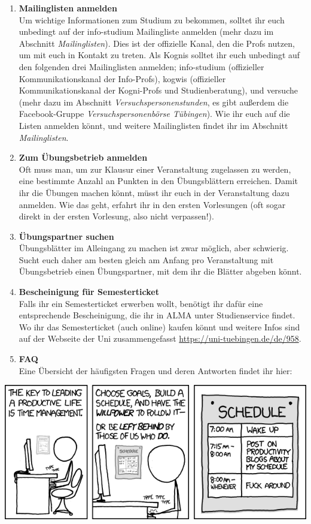 \begin{enumerate}[label=$\bigcirc$]
  	\item \textbf{Mailinglisten anmelden}\\
  	\ifinfo
  		Um wichtige Informationen zum Studium zu bekommen, solltet ihr euch unbedingt auf der info-studium Mailingliste anmelden (mehr dazu im Abschnitt \textit{Mailinglisten}). Dies ist der offizielle Kanal, den die Profs nutzen, um mit euch in Kontakt zu treten.
  	\else
  		Als Kognis solltet ihr euch unbedingt auf den folgenden drei Mailinglisten anmelden; info-studium (offizieller Kommunikationskanal der Info-Profs), kogwis (offizieller Kommunikationskanal der Kogni-Profs und Studienberatung), und versuche (mehr dazu im Abschnitt \textit{Versuchspersonenstunden}, es gibt außerdem die Facebook-Gruppe \textit{Versuchspersonenbörse Tübingen}). Wie ihr euch auf die Listen anmelden könnt, und weitere Mailinglisten findet ihr im Abschnitt \textit{Mailinglisten}.
  	\fi
  	
	\item \textbf{Zum Übungsbetrieb anmelden} \\
	  	Oft muss man, um zur Klausur einer Veranstaltung zugelassen zu werden, eine bestimmte Anzahl an Punkten in den Übungsblättern erreichen. Damit ihr die Übungen machen könnt, müsst ihr euch in der Veranstaltung dazu anmelden. Wie das geht, erfahrt ihr in den ersten Vorlesungen (oft sogar direkt in der ersten Vorlesung, also nicht verpassen!).
	  	
  	\item \textbf{Übungspartner suchen} \\
	  	Übungsblätter im Alleingang zu machen ist zwar möglich, aber schwierig. Sucht euch daher am besten gleich am Anfang pro Veranstaltung mit Übungsbetrieb einen Übungspartner, mit dem ihr die Blätter abgeben könnt.
	  	
	\item \textbf{Bescheinigung für Semesterticket} \\	
		Falls ihr ein Semesterticket erwerben wollt, benötigt ihr dafür eine entsprechende Bescheinigung, die ihr in ALMA unter Studienservice findet. Wo ihr das Semesterticket (auch online) kaufen könnt und weitere Infos sind auf der Webseite der Uni zusammengefasst \url{https://uni-tuebingen.de/de/958}.
	
	\item \textbf{FAQ} \\
	\ifinfo
		Eine Übersicht der häufigsten Fragen und deren Antworten findet ihr hier:
	\else
	\fi
	
  \end{enumerate}

\vfill

\begin{center}
\includegraphics[width=0.8\hsize]{shared/xkcd/time_management.png}
\end{center}
